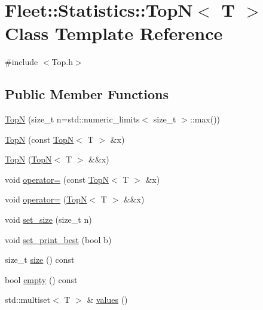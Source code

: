 \hypertarget{class_fleet_1_1_statistics_1_1_top_n}{}\section{Fleet\+:\+:Statistics\+:\+:TopN$<$ T $>$ Class Template Reference}
\label{class_fleet_1_1_statistics_1_1_top_n}


{\ttfamily \#include $<$Top.\+h$>$}

\subsection*{Public Member Functions}
\begin{DoxyCompactItemize}
\item 
\hyperlink{class_fleet_1_1_statistics_1_1_top_n_afd0ca4daca84e66e91a4101cb009af44}{TopN} (size\+\_\+t n=std\+::numeric\+\_\+limits$<$ size\+\_\+t $>$\+::max())
\item 
\hyperlink{class_fleet_1_1_statistics_1_1_top_n_a3c7b5c9c3fd6e171a0b2d6b1f48cddf3}{TopN} (const \hyperlink{class_fleet_1_1_statistics_1_1_top_n}{TopN}$<$ T $>$ \&x)
\item 
\hyperlink{class_fleet_1_1_statistics_1_1_top_n_af1a27643fa0841afaa7e8ca0e87d9a49}{TopN} (\hyperlink{class_fleet_1_1_statistics_1_1_top_n}{TopN}$<$ T $>$ \&\&x)
\item 
void \hyperlink{class_fleet_1_1_statistics_1_1_top_n_a38d3aba302a215992c603ff2ab13e8fc}{operator=} (const \hyperlink{class_fleet_1_1_statistics_1_1_top_n}{TopN}$<$ T $>$ \&x)
\item 
void \hyperlink{class_fleet_1_1_statistics_1_1_top_n_a6653acde6effd65aa0226cbefc2c8f4f}{operator=} (\hyperlink{class_fleet_1_1_statistics_1_1_top_n}{TopN}$<$ T $>$ \&\&x)
\item 
void \hyperlink{class_fleet_1_1_statistics_1_1_top_n_a3151da8c2aaab75195d6f702fbfba436}{set\+\_\+size} (size\+\_\+t n)
\item 
void \hyperlink{class_fleet_1_1_statistics_1_1_top_n_a762c937fe5dcab09d87d2414201b6b1e}{set\+\_\+print\+\_\+best} (bool b)
\item 
size\+\_\+t \hyperlink{class_fleet_1_1_statistics_1_1_top_n_a0ce96f95fbac59ba2a858b66b5a6690a}{size} () const
\item 
bool \hyperlink{class_fleet_1_1_statistics_1_1_top_n_ac2b70eef6c75a0459acc88b2539dbc0b}{empty} () const
\item 
std\+::multiset$<$ T $>$ \& \hyperlink{class_fleet_1_1_statistics_1_1_top_n_ab271ffaa959392966d1d00407485bfc9}{values} ()

\end{DoxyCompactItemize}
